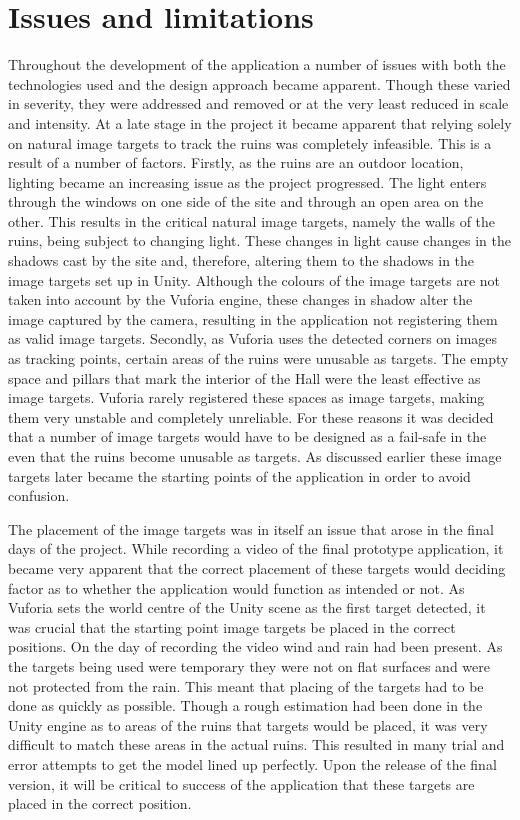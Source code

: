 \section{Issues and limitations}
Throughout the development of the application a number of issues with both the technologies used and the design approach became apparent. Though these varied in severity, they were addressed and removed or at the very least reduced in scale and intensity.
At a late stage in the project it became apparent that relying solely on natural image targets to track the ruins was completely infeasible. This is a result of a number of factors.
Firstly, as the ruins are an outdoor location, lighting became an increasing issue as the project progressed. The light enters through the windows on one side of the site and through an open area on the other. This results in the critical natural image targets, namely the walls of the ruins, being subject to changing light. These changes in light cause changes in the shadows cast by the site and, therefore, altering them to the shadows in the image targets set up in Unity. Although the colours of the image targets are not taken into account by the Vuforia engine, these changes in shadow alter the image captured by the camera, resulting in the application not registering them as valid image targets.
Secondly, as Vuforia uses the detected corners on images as tracking points, certain areas of the ruins were unusable as targets. The empty space and pillars that mark the interior of the Hall were the least effective as image targets. Vuforia rarely registered these spaces as image targets, making them very unstable and completely unreliable. For these reasons it was decided that a number of image targets would have to be designed as a fail-safe in the even that the ruins become unusable as targets.
As discussed earlier these image targets later became the starting points of the application in order to avoid confusion.

The placement of the image targets was in itself an issue that arose in the final days of the project. While recording a video of the final prototype application, it became very apparent that the correct placement of these targets would deciding factor as to whether the application would function as intended or not. As Vuforia sets the world centre of the Unity scene as the first target detected, it was crucial that the starting point image targets be placed in the correct positions. On the day of recording the video wind and rain had been present. As the targets being used were temporary they were not on flat surfaces and were not protected from the rain. This meant that placing of the targets had to be done as quickly as possible. Though a rough estimation had been done in the Unity engine as to areas of the ruins that targets would be placed, it was very difficult to match these areas in the actual ruins. This resulted in many trial and error attempts to get the model lined up perfectly. Upon the release of the final version, it will be critical to success of the application that these targets are placed in the correct position.


